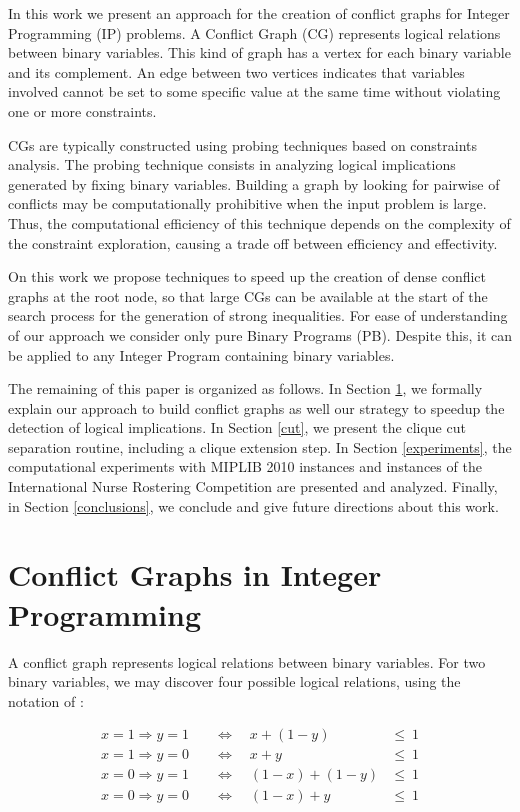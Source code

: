 \documentclass{endm}
\begin{document}
In this work we present an approach for the creation of conflict graphs for Integer Programming (IP) problems. A Conflict Graph (CG) represents logical relations between binary variables. This kind of graph has a vertex for each binary variable and its complement. An edge between two vertices indicates that variables involved cannot be set to some specific value at the same time without violating one or more constraints.

CGs are typically constructed using probing techniques \cite{Borndorfer1998} based on constraints analysis. The probing technique consists in analyzing logical implications generated by fixing binary variables.  Building a graph by looking for pairwise of conflicts may be computationally prohibitive when the input problem is large. Thus, the computational efficiency of this technique depends on the complexity of the constraint exploration, causing a trade off between efficiency and effectivity. 

On this work we propose techniques to speed up the creation of dense conflict graphs at the root node, so that large CGs can be available at the start of the search process for the generation of strong inequalities. For ease of understanding of our approach we consider only pure Binary Programs (PB). Despite this, it can be applied to any Integer Program containing binary variables. 

The remaining of this paper is organized as follows. In Section \ref{seccgraph}, we formally explain our approach to build conflict graphs as well our strategy to speedup the detection of logical implications. In Section \ref{cut}, we present the clique cut separation routine, including a clique extension step. In Section \ref{experiments}, the computational experiments with MIPLIB 2010 instances \cite{miplib} and instances of the International Nurse Rostering Competition \cite{haspeslagh} are presented and analyzed. Finally, in Section \ref{conclusions}, we conclude and give future directions about this work.

\section{Conflict Graphs in Integer Programming}\label{seccgraph}

A conflict graph represents logical relations between binary variables. For two binary variables, we may discover four possible logical relations, using the notation of \cite{atamturk}:


\begin{align}
x = 1 \Rightarrow y = 1 & \quad \Longleftrightarrow \quad x + (1 - y) & \leq \ 1\\
x = 1 \Rightarrow y = 0 & \quad \Longleftrightarrow \quad x + y & \leq \ 1 \\
x = 0 \Rightarrow y = 1 & \quad \Longleftrightarrow \quad (1 - x) + (1 - y) & \leq \ 1 \\
x = 0 \Rightarrow y = 0 & \quad \Longleftrightarrow \quad (1 - x) + y & \leq \ 1
\end{align}
\end{document}
